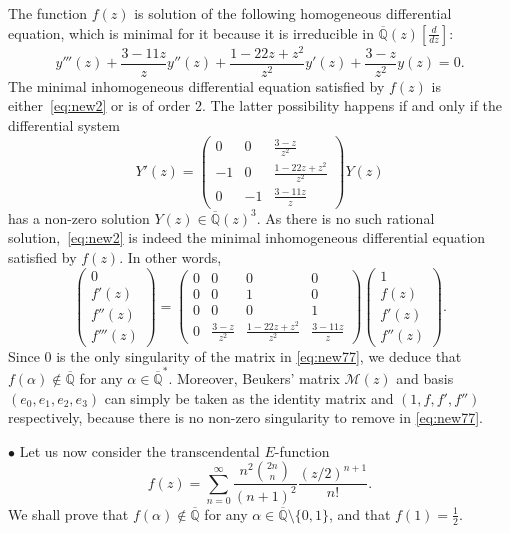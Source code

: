 \documentclass[reqno,english,12pt,a4paper]{smfart}
\numberwithin{equation}{section}
\def\Qbar{\overline{\mathbb Q}}
\def\f{{\bf f}}
\begin{document}
The function $f(z)$ is solution of the following homogeneous differential equation, which is minimal for it because it is irreducible in $\Qbar(z)[\frac{d}{dz}]$:
\begin{equation}\label{eq:new2}
y'''(z)+ \frac{3-11z}{z} y''(z)+\frac{1-22z+z^2}{z^2} y'(z)+\frac{3-z}{z^2} y(z)=0.
\end{equation}
The minimal inhomogeneous differential equation satisfied by $f(z)$ is either~\eqref{eq:new2} or is of order 2. The latter possibility happens  if and only if  the differential system
$$
Y'(z)=
\left(\begin{array}{ccc}
 0 & 0 &  \frac{3-z}{z^2}
\\
-1&0& \frac{1-22z+z^2}{z^2}
\\
0&-1& \frac{3-11z}{z}
\end{array} \right) Y(z)
$$
has a non-zero solution $Y(z)\in \Qbar(z)^3$. As there is no such rational solution,~\eqref{eq:new2} is indeed the minimal inhomogeneous differential equation satisfied by $f(z)$. In other words, 
\begin{equation}\label{eq:new77}
\left(\begin{array}{c}0 \\ f'(z) \\ f''(z)\\f'''(z) \end{array} \right)
= \left(\begin{array}{cccc}
 0 & 0 & 0 &0
\\
0&0& 1&0
\\
0&0& 0&1
\\
0& \frac{3-z}{z^2}&\frac{1-22z+z^2}{z^2}&\frac{3-11z}{z}
\end{array} \right)
\left(\begin{array}{c}1 \\ f(z) \\ f'(z)\\f''(z) \end{array} \right).
\end{equation}
Since $0$ is the only singularity of the matrix in \eqref{eq:new77}, we deduce that $f(\alpha)\notin \Qbar$ for any $\alpha\in \Qbar^*$. Moreover, Beukers' matrix $\mathcal{M}(z)$ and basis $(e_0,e_1,e_2,e_3)$ can simply be taken as the identity matrix and $(1,f,f',f'')$ respectively, because there is no non-zero singularity to remove in \eqref{eq:new77}.

\medskip

$\bullet$ Let us now consider the transcendental $E$-function
$$
f(z)=\sum_{n=0}^\infty \frac{n^2\binom{2n}{n}}{(n+1)^2}  \frac{(z/2)^{n+1}}{n!}. 
$$
We shall prove that $f(\alpha)\notin \Qbar$ for any $\alpha\in \Qbar\setminus \{0,1\}$, and that $f(1)=\frac12$.
\end{document}
